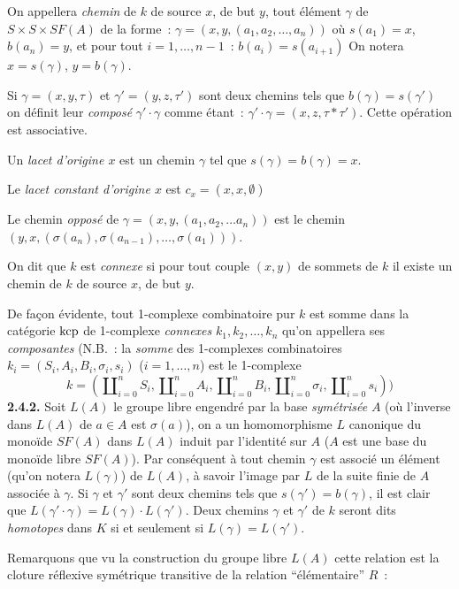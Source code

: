 On appellera \emph{chemin} de $k$ de source $x$, de but $y$, tout élément $\gamma$ de $S \times S \times SF(A)$ de la forme~: $\gamma = (x,y,(a_1,a_2,\dots, a_n))$ où $s(a_1) = x$, $b(a_n) = y$, et pour tout $i = 1,\dots,n-1$~: $b(a_i) = s(a_{i+1})$
On notera $x = s(\gamma)$, $y = b(\gamma)$.

Si $\gamma = (x,y,\tau)$ et $\gamma' = (y,z,\tau')$ sont deux chemins tels que $b(\gamma)=s(\gamma')$ on définit leur \emph{composé} $\gamma' \cdot \gamma$ comme étant~: $\gamma' \cdot \gamma = (x,z,\tau * \tau')$. Cette opération est associative.

Un \emph{lacet d'origine $x$} est un chemin $\gamma$ tel que $s(\gamma) = b(\gamma) = x$.

Le \emph{lacet constant d'origine $x$} est $c_x = (x,x,\emptyset)$

Le chemin \emph{opposé} de $\gamma = (x,y,(a_1,a_2,\dots a_n))$ est le chemin $(y,x,(\sigma(a_n),\sigma(a_{n-1}),\dots,\sigma(a_1)))$.

On dit que $k$ est \emph{connexe} si pour tout couple $(x,y)$ de sommets de $k$ il existe un chemin de $k$ de source $x$, de but $y$.

De façon évidente, tout 1-complexe combinatoire pur $k$ est somme dans la catégorie $\operatorname{kcp}$ de 1-complexe \emph{connexes} $k_1,k_2,\dots,k_n$ qu'on appellera ses \emph{composantes} (N.B.~: la \emph{somme} des 1-complexes combinatoires $k_i = (S_i,A_i,B_i,\sigma_i,s_i)$ ($i = 1,\dots,n$) est le 1-complexe
$$
k = (\amalg_{i = 0}^n S_i, \amalg_{i = 0}^n A_i, \amalg_{i = 0}^n B_i, \amalg_{i = 0}^n \sigma_i, \amalg_{i = 0}^n s_i))
$$
{\bf 2.4.2.} Soit $L(A)$ le groupe libre engendré par la base \emph{symétrisée} $A$ (où l'inverse dans $L(A)$ de $a \in A$ est $\sigma(a)$), on a un homomorphisme $L$ canonique du monoïde $SF(A)$ dans $L(A)$ induit par l'identité sur $A$ ($A$ est une base du monoïde libre $SF(A)$). Par conséquent à tout chemin $\gamma$ est associé un élément (qu'on notera $L(\gamma)$) de $L(A)$, à savoir l'image par $L$ de la suite finie de $A$ associée à $\gamma$. Si $\gamma$ et $\gamma'$ sont deux chemins tels que $s(\gamma') = b(\gamma)$, il est clair que $L(\gamma' \cdot \gamma) = L(\gamma) \cdot L(\gamma')$.
Deux chemins $\gamma$ et $\gamma'$ de $k$ seront dits \emph{homotopes} dans $K$ si et seulement si $L(\gamma) = L(\gamma')$.

Remarquons que vu la construction du groupe libre $L(A)$ cette relation est la cloture réflexive symétrique transitive de la relation ``élémentaire'' $R$~:


